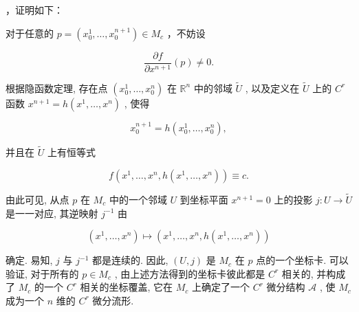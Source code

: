 ，证明如下：

对于任意的  $p = (x_0^1,\dots ,x_0^{n + 1})\in M_c$  ，不妨设

$$
\frac {\partial f}{\partial x ^ {n + 1}} (p) \neq 0.
$$

根据隐函数定理, 存在点  $(x_0^1,\dots ,x_0^n)$  在  $\mathbb{R}^n$  中的邻域  $\tilde{U}$ , 以及定义在  $\tilde{U}$  上的  $C^r$  函数  $x^{n + 1} = h(x^{1},\dots ,x^{n})$ , 使得

$$
x _ {0} ^ {n + 1} = h \left(x _ {0} ^ {1}, \dots , x _ {0} ^ {n}\right),
$$

并且在  $\tilde{U}$  上有恒等式

$$
f (x ^ {1}, \dots , x ^ {n}, h (x ^ {1}, \dots , x ^ {n})) \equiv c.
$$

由此可见, 从点  $p$  在  $M_{c}$  中的一个邻域  $U$  到坐标平面  $x^{n + 1} = 0$  上的投影  $j: U \to \tilde{U}$  是一一对应, 其逆映射  $j^{-1}$  由

$$
(x ^ {1}, \dots , x ^ {n}) \longmapsto (x ^ {1}, \dots , x ^ {n}, h (x ^ {1}, \dots , x ^ {n}))
$$

确定. 易知,  $j$  与  $j^{-1}$  都是连续的. 因此,  $(U,j)$  是  $M_{c}$  在  $p$  点的一个坐标卡. 可以验证, 对于所有的  $p \in M_{c}$ , 由上述方法得到的坐标卡彼此都是  $C^{r}$  相关的, 并构成了  $M_{c}$  的一个  $C^{r}$  相关的坐标覆盖, 它在  $M_{c}$  上确定了一个  $C^{r}$  微分结构  $\mathcal{A}$ , 使  $M_{c}$  成为一个  $n$  维的  $C^{r}$  微分流形.



